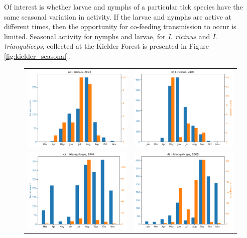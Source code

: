 \documentclass{article}
\begin{document}
Of interest is whether larvae and nymphs of a particular tick species have the same seasonal variation in activity. If the larvae and nymphs are active at different times, then the opportunity for co-feeding transmission to occur is limited. Seasonal activity for nymphs and larvae, for \textit{I. ricinus} and \textit{I. trianguliceps}, collected at the Kielder Forest is presented in Figure \ref{fig:kielder_seasonal}.

\begin{figure}
	\centering
	\begin{tabular}{ll}
		\includegraphics[width=.5\linewidth,valign=m]{A) I. ricinus, 2004} & \includegraphics[width=.5\linewidth,valign=m]{B) I. ricinus, 2005} \\
		\includegraphics[width=.5\linewidth,valign=m]{C) I. trianguliceps, 2004} & \includegraphics[width=.5\linewidth,valign=m]{D) I. trianguliceps, 2005} \\

\end{tabular}
\end{figure}
\end{document}
